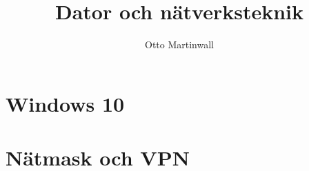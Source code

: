 

\title{Dator och nätverksteknik}
\author{Otto Martinwall}


\maketitle
\tableofcontents
\newpage
\newtheorem{definition}{Definition}
\newtheorem{theorem}{Theorem}

\section{Windows 10}


\section{Nätmask och VPN}




